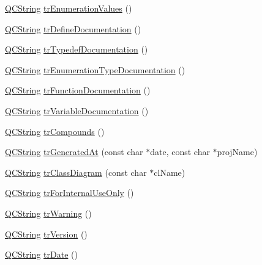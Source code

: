 \begin{DoxyCompactItemize}
\mbox{\hyperlink{class_q_c_string}{Q\+C\+String}} \mbox{\hyperlink{class_translator_italian_aa0dd9c3f58206afa80914042946da23b}{tr\+Enumeration\+Values}} ()
\item 
\mbox{\hyperlink{class_q_c_string}{Q\+C\+String}} \mbox{\hyperlink{class_translator_italian_a467726c14d4b75a1144b97bdf5bb410f}{tr\+Define\+Documentation}} ()
\item 
\mbox{\hyperlink{class_q_c_string}{Q\+C\+String}} \mbox{\hyperlink{class_translator_italian_afd2f70e60e563344ef62b76367170148}{tr\+Typedef\+Documentation}} ()
\item 
\mbox{\hyperlink{class_q_c_string}{Q\+C\+String}} \mbox{\hyperlink{class_translator_italian_a8579c730e25b0653237e0d2ceb800fe5}{tr\+Enumeration\+Type\+Documentation}} ()
\item 
\mbox{\hyperlink{class_q_c_string}{Q\+C\+String}} \mbox{\hyperlink{class_translator_italian_a18e5f73c0b40e13b6eee482d6c21415b}{tr\+Function\+Documentation}} ()
\item 
\mbox{\hyperlink{class_q_c_string}{Q\+C\+String}} \mbox{\hyperlink{class_translator_italian_a19f7a03cdd685b46a7e1ef4449035b39}{tr\+Variable\+Documentation}} ()
\item 
\mbox{\hyperlink{class_q_c_string}{Q\+C\+String}} \mbox{\hyperlink{class_translator_italian_abf0c32fda68ed838bf3796d4bdea6cca}{tr\+Compounds}} ()
\item 
\mbox{\hyperlink{class_q_c_string}{Q\+C\+String}} \mbox{\hyperlink{class_translator_italian_a61308d1ccf1b497c045d70605ab0673f}{tr\+Generated\+At}} (const char $\ast$date, const char $\ast$proj\+Name)
\item 
\mbox{\hyperlink{class_q_c_string}{Q\+C\+String}} \mbox{\hyperlink{class_translator_italian_af92767bf648ef6c5776a551dcca0b411}{tr\+Class\+Diagram}} (const char $\ast$cl\+Name)
\item 
\mbox{\hyperlink{class_q_c_string}{Q\+C\+String}} \mbox{\hyperlink{class_translator_italian_a7350dbcaece82544ae39e8a5f50ff72b}{tr\+For\+Internal\+Use\+Only}} ()
\item 
\mbox{\hyperlink{class_q_c_string}{Q\+C\+String}} \mbox{\hyperlink{class_translator_italian_aec599f2697a349395fe31e0753fe5f09}{tr\+Warning}} ()
\item 
\mbox{\hyperlink{class_q_c_string}{Q\+C\+String}} \mbox{\hyperlink{class_translator_italian_ad0ce3ecfeed3517ffbdda359e0de92cc}{tr\+Version}} ()
\item 
\mbox{\hyperlink{class_q_c_string}{Q\+C\+String}} \mbox{\hyperlink{class_translator_italian_a3a7317cfeb2960b8a03d4be585e33eee}{tr\+Date}} ()

\end{DoxyCompactItemize}
